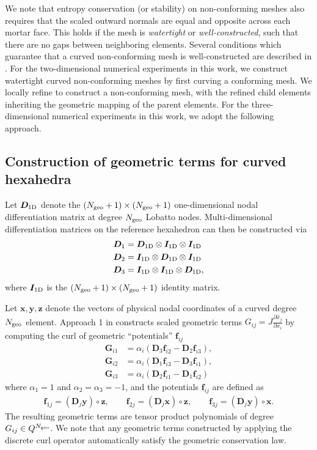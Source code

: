 \documentclass{svjour3}                     %
\renewcommand{\hat}{\widehat}
\newcommand{\pd}[2]{\frac{\partial#1}{\partial#2}}
\newcommand{\LRp}[1]{\left( #1 \right)}
\begin{document}
We note that entropy conservation (or stability) on non-conforming meshes also requires that the scaled outward normals are equal and opposite across each mortar face.  This holds if the mesh is \emph{watertight} or \emph{well-constructed}, such that there are no gaps between neighboring elements.  Several conditions which guarantee that a curved non-conforming mesh is well-constructed are described in \cite{kopriva2019free}.  For the two-dimensional numerical experiments in this work, we construct watertight curved non-conforming meshes by first curving a conforming mesh.  We locally refine to construct a non-conforming mesh, with the refined child elements inheriting the geometric mapping of the parent elements.  For the three-dimensional numerical experiments in this work, we adopt the following approach.


\subsection{Construction of geometric terms for curved hexahedra}

Let $\bm{D}_{\rm 1D}$ denote the $(N_{\rm geo}+1) \times (N_{\rm geo}+1)$ one-dimensional nodal differentiation matrix at degree $N_{\rm geo}$ Lobatto nodes.  Multi-dimensional differentiation matrices on the reference hexahedron can then be constructed via
\begin{align*}
\bm{D}_1 &= \bm{D}_{\rm 1D} \otimes \bm{I}_{\rm 1D}\otimes \bm{I}_{\rm 1D}\\
\bm{D}_2 &= \bm{I}_{\rm 1D} \otimes \bm{D}_{\rm 1D}\otimes \bm{I}_{\rm 1D}\\
\bm{D}_3 &= \bm{I}_{\rm 1D} \otimes \bm{I}_{\rm 1D}\otimes \bm{D}_{\rm 1D},
\end{align*}
where $\bm{I}_{\rm 1D}$ is the $(N_{\rm geo}+1) \times (N_{\rm geo}+1)$ identity matrix.  

Let $\bm{x},\bm{y},\bm{z}$ denote the vectors of physical nodal coordinates of a curved degree $N_{\rm geo}$ element.  Approach 1 in \cite{kopriva2006metric} constructs scaled geometric terms $G_{ij} = J\pd{\hat{x}_j}{x_i}$ by computing the curl of geometric ``potentials'' $\bm{f}_{ij}$
\begin{align*}
\bm{G}_{i1} &= \alpha_i\LRp{\bm{D}_3\bm{f}_{i2} - \bm{D}_2\bm{f}_{i3}},\\
\bm{G}_{i2} &=\alpha_i \LRp{\bm{D}_1\bm{f}_{i3} - \bm{D}_3\bm{f}_{i1}},\\
\bm{G}_{i3} &= \alpha_i\LRp{\bm{D}_2\bm{f}_{i1} - \bm{D}_1\bm{f}_{i2}}
\end{align*}
where $\alpha_1 = 1$ and $\alpha_2 = \alpha_3 = -1$, and the potentials $\bm{f}_{ij}$ are defined as 
\begin{align}
\bm{f}_{1j} = \LRp{ \bm{D}_j \bm{y}} \circ \bm{z}, \qquad 
\bm{f}_{2j} = \LRp{ \bm{D}_j \bm{x}} \circ \bm{z}, \qquad
\bm{f}_{3j} = \LRp{ \bm{D}_j \bm{y}} \circ \bm{x}.  \label{eq:geopot}
\end{align}
The resulting geometric terms are tensor product polynomials of degree $G_{ij} \in Q^{N_{\rm geo}}$.  We note that any geometric terms constructed by applying the discrete curl operator automatically satisfy the geometric conservation law.  
\end{document}
